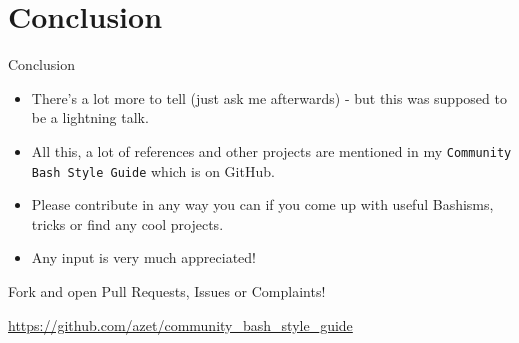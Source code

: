 \section{Conclusion}\label{conclusion}

\begin{frame}{Conclusion}

\begin{itemize}
\itemsep1pt\parskip0pt
\item
  There's a lot more to tell (just ask me afterwards) - but this was
  supposed to be a lightning talk.
\item
  All this, a lot of references and other projects are mentioned in my
  \texttt{Community Bash Style Guide} which is on GitHub.
\item
  Please contribute in any way you can if you come up with useful
  Bashisms, tricks or find any cool projects.
\item
  Any input is very much appreciated!
\end{itemize}

\begin{block}{Fork and open Pull Requests, Issues or Complaints!}

\url{https://github.com/azet/community_bash_style_guide}

\end{block}

\end{frame}
